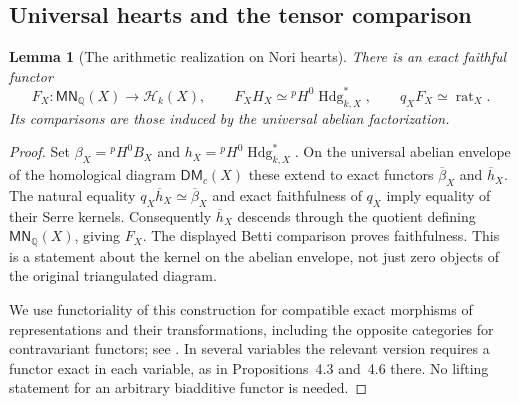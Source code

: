 \documentclass[11pt]{article}
\numberwithin{equation}{section}
\newtheorem{lemma}[lemma]{Lemma}
\theoremstyle{definition}
\theoremstyle{remark}
\newcommand{\Q}{\mathbb Q}
\newcommand{\MN}{\mathsf{MN}}
\newcommand{\rat}{\operatorname{rat}}
\newcommand{\pH}{{}^{p}\!H}
\begin{document}
\subsection{Universal hearts and the tensor comparison}

\begin{lemma}[The arithmetic realization on Nori hearts]
\label{lem:arithmetic-heart}
There is an exact faithful functor
\[
 F_X:\MN_\Q(X)\longrightarrow\mathcal H_k(X),\qquad
 F_XH_X\simeq\pH^0\operatorname{Hdg}_{k,X}^*,\qquad
 q_XF_X\simeq\rat_X.
\]
Its comparisons are those induced by the universal abelian factorization.
\end{lemma}
\begin{proof}
Set $\beta_X=\pH^0B_X$ and
$h_X=\pH^0\operatorname{Hdg}_{k,X}^*$. On the universal abelian
envelope of the homological diagram $\mathsf{DM}_c(X)$ these extend
to exact functors $\overline\beta_X$ and $\overline h_X$.
The natural equality $q_X\overline h_X\simeq\overline\beta_X$ and
exact faithfulness of $q_X$ imply equality of their Serre kernels.
Consequently $\overline h_X$ descends through the quotient defining
$\MN_\Q(X)$, giving $F_X$. The displayed Betti comparison proves
faithfulness. This is a statement about the kernel on the abelian
envelope, not just zero objects of the original triangulated diagram.

We use functoriality of this construction for compatible exact morphisms
of representations and their transformations, including the opposite
categories for contravariant functors; see
\cite[\S\S2--3]{TerenziFunctoriality}. In several variables the relevant
version requires a functor exact in each variable, as in Propositions~4.3
and~4.6 there. No lifting statement for an arbitrary biadditive functor
is needed.
\end{proof}
\end{document}
